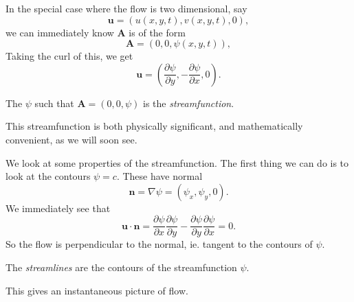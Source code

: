 \documentclass[a4paper]{article}
\begin{document}
In the special case where the flow is two dimensional, say
\[
  \mathbf{u} = (u(x, y, t), v(x, y, t), 0),
\]
we can immediately know $\mathbf{A}$ is of the form
\[
  \mathbf{A} = (0, 0, \psi(x, y, t)),
\]
Taking the curl of this, we get
\[
  \mathbf{u} = \left(\frac{\partial \psi}{\partial y}, -\frac{\partial \psi}{\partial x}, 0\right).
\]
\begin{defi}[Streamfunction]
  The $\psi$ such that $\mathbf{A} = (0, 0, \psi)$ is the \emph{streamfunction}.
\end{defi}
This streamfunction is both physically significant, and mathematically convenient, as we will soon see.

We look at some properties of the streamfunction. The first thing we can do is to look at the contours $\psi = c$. These have normal
\[
  \mathbf{n} = \nabla \psi = \left(\psi_x, \psi_y, 0\right).
\]
We immediately see that
\[
  \mathbf{u}\cdot \mathbf{n} = \frac{\partial \psi}{\partial x} \frac{\partial \psi}{\partial y} - \frac{\partial \psi}{\partial y}\frac{\partial \psi}{\partial x} = 0.
\]
So the flow is perpendicular to the normal, ie. tangent to the contours of $\psi$.
\begin{defi}[Streamlines]
  The \emph{streamlines} are the contours of the streamfunction $\psi$.
\end{defi}
This gives an instantaneous picture of flow.
\end{document}
